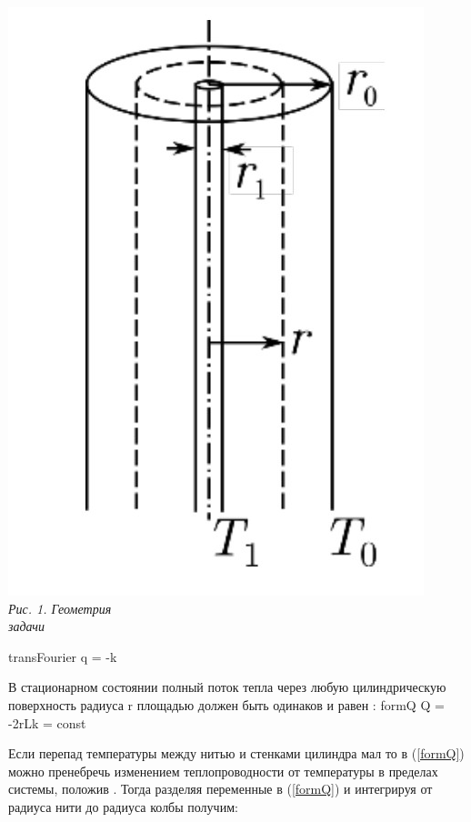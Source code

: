 \begin{minipage}[c]{0.4\textwidth}
    \begin{center}
        \includegraphics[scale=0.22]{picks/2_2_3_scheme1.jpg} \\
        \textit{\textcolor[HTML]{000000}{Рис. 1. Геометрия \\ задачи}}
    \end{center}
\end{minipage}

\formula
{}
{transFourier}
{q = -k}

\newpage

\formula
{В стационарном состоянии полный поток тепла через любую цилиндрическую поверхность радиуса r площадью   должен быть одинаков и равен :}
{formQ}
{Q = -2\pi rL\cdot k = const}

Если перепад температуры   между нитью и стенками цилиндра мал  то в (\ref{formQ}) можно пренебречь изменением теплопроводности от температуры в пределах системы, положив . Тогда разделяя переменные в (\ref{formQ}) и интегрируя от радиуса нити до радиуса колбы получим:

